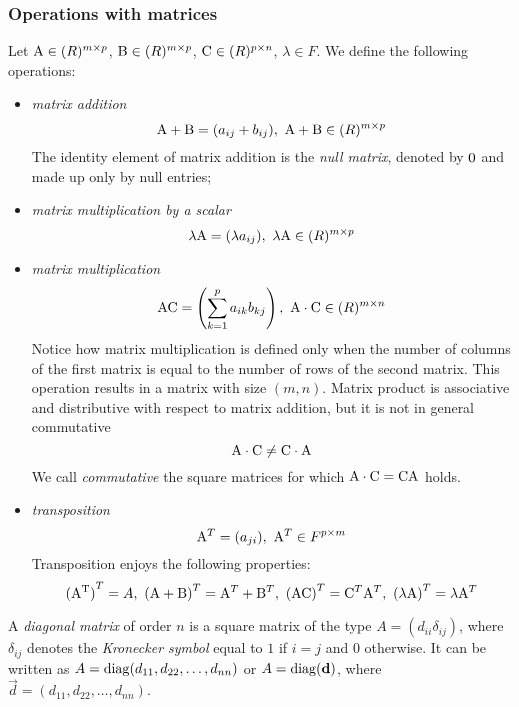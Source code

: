 \subsubsection{Operations with matrices}

Let $\mathrm{A} \in \mathbb{(}R)^{m \times p}$, $\mathrm{B} \in \mathbb{(}R)^{m \times p}$, $\mathrm{C} \in \mathbb{(}R)^{p \times n}$, $\lambda \in F$. We define the following operations:

\begin{itemize}
    \item \textit{matrix addition}
    $$ \mathrm{A} + \mathrm{B} = (a_{ij} + b_{ij}),\ \mathrm{A} + \mathrm{B} \in \mathbb{(}R)^{m \times p} $$
    The identity element of matrix addition is the \textit{null matrix}, denoted by $\mathrm{0}$ and made up only by null entries;
    \item \textit{matrix multiplication by a scalar}
    $$ \lambda\mat{A} = (\lambda a_{ij}),\ \lambda\mat{A} \in \set(R)^{m \times p} $$
    \item \textit{matrix multiplication}
    $$ \mathrm{A}\mathrm{C} = \left(\sum_{k = 1}^{p}a_{ik}b_{kj}\right),\ \mathrm{A}\cdot \mathrm{C} \in \mathbb{(}R)^{m \times n} $$
    Notice how matrix multiplication is defined only when the number of columns of the first matrix is equal to the number of rows of the second matrix. This operation results in a matrix with size $(m, n)$. Matrix product is associative and distributive with respect to matrix addition, but it is not in general commutative
    $$ \mathrm{A} \cdot \mathrm{C} \neq \mathrm{C}\cdot \mathrm{A} $$
    We call \textit{commutative} the square matrices for which $\mathrm{A}\cdot \mathrm{C} = \mathrm{C}\mathrm{A}$ holds.
    \item \textit{transposition}
    $$ \mathrm{A}^T = (a_{ji}),\ \mathrm{A}^T \in F^{p \times m} $$
    Transposition enjoys the following properties:
    $$ \transp{(\transp{A})} = A,\ \transp{(A + B)} = \transp{A} + \transp{B},\ \transp{(AC)} = \transp{C}\transp{A},\ \transp{(\lambda\mat{A})} = \lambda\transp{A} $$
\end{itemize}



\begin{definition}
    A \textit{diagonal matrix} of order $n$ is a square matrix of the type $A = (d_{ii}\delta_{ij})$, where $\delta_{ij}$ denotes the \textit{Kronecker symbol} equal to $1$ if $i = j$ and $0$ otherwise. It can be written as $A = \mathrm{diag}(d_{11}, d_{22}, \hdots, d_{nn})$ or $A = \mathrm{diag}(\mathbf{d})$, where $\vec{d} = (d_{11}, d_{22}, \hdots, d_{nn})$.
\end{definition}

